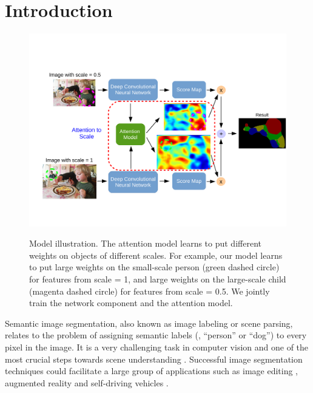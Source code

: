 \section{Introduction}

\begin{figure} 
  \centering          
   \includegraphics[width=0.99\linewidth]{fig/model_illustration3.pdf} \\
  \vspace{1pt}
  \caption{Model illustration. The attention model learns to put different weights on objects of different scales. For example, our model learns to put large weights on the small-scale person (green dashed circle) for features from scale = 1, and large weights on the large-scale child (magenta dashed circle) for features from scale = 0.5. We jointly train the network component and the attention model.}
  \label{fig:model_illustration}
\end{figure}  

Semantic image segmentation, also known as image labeling or scene parsing, relates to the problem of assigning semantic labels (\eg, ``person'' or ``dog'') to every pixel in the image. It is a very challenging task in computer vision and one of the most crucial steps towards scene understanding \cite{everingham2014pascal}. Successful image segmentation techniques could facilitate a large group of applications such as image editing \cite{evening2005adobe}, augmented reality \cite{azuma1997survey} and self-driving vehicles \cite{fritsch2013new}.


